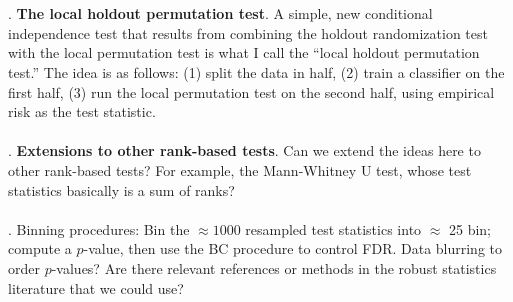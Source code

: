 \documentclass[12pt]{article}
\begin{document}
\\ \\ . \textbf{The local holdout permutation test}. A simple, new conditional independence test that results from combining the holdout randomization test \parencite{Tansey2021a} with the local permutation test \parencite{Kim2021} is what I call the ``local holdout permutation test.'' The idea is as follows: (1) split the data in half, (2) train a classifier on the first half, (3) run the local permutation test on the second half, using empirical risk as the test statistic.
\\ \\ . \textbf{Extensions to other rank-based tests}. Can we extend the ideas here to other rank-based tests? For example, the Mann-Whitney U test, whose test statistics basically is a sum of ranks?
\\ \\ . Binning procedures: Bin the $\approx 1000$ resampled test statistics into $\approx$ 25 bin; compute a $p$-value, then use the BC procedure to control FDR. Data blurring to order $p$-values? Are there relevant references or methods in the robust statistics literature that we could use?

\end{document}
